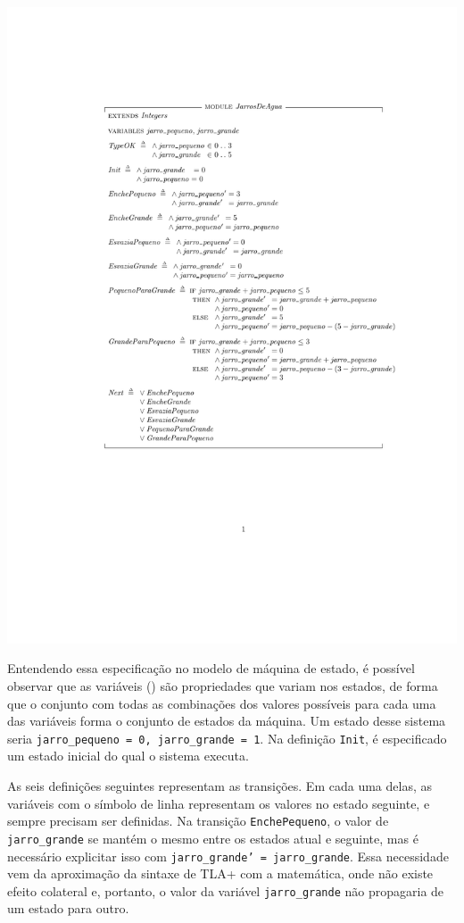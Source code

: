 \hspace*{-2in}
\vspace*{-1in}
\includegraphics{JarrosDeAgua.pdf}

Entendendo essa especificação no modelo de máquina de estado, é possível observar que as variáveis (\VARIABLES) são propriedades que variam nos estados, de forma que o conjunto com todas as combinações dos valores possíveis para cada uma das variáveis forma o conjunto de estados da máquina. Um estado desse sistema seria \texttt{jarro\_pequeno = 0, jarro\_grande = 1}. Na definição \texttt{Init}, é especificado um estado inicial do qual o sistema executa.

As seis definições seguintes representam as transições. Em cada uma delas, as variáveis com o símbolo de linha representam os valores no estado seguinte, e sempre precisam ser definidas. Na transição \texttt{EnchePequeno}, o valor de \texttt{jarro\_grande} se mantém o mesmo entre os estados atual e seguinte, mas é necessário explicitar isso com \texttt{jarro\_grande' = jarro\_grande}. Essa necessidade vem da aproximação da sintaxe de TLA+ com a matemática, onde não existe efeito colateral e, portanto, o valor da variável \texttt{jarro\_grande} não propagaria de um estado para outro.


